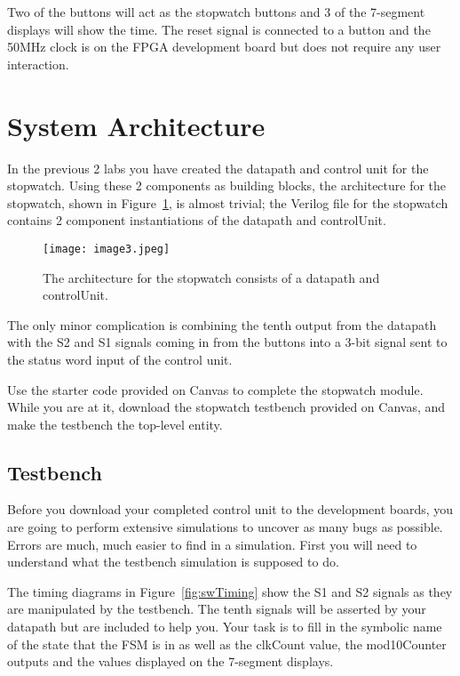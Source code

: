 Two of the buttons will act as the stopwatch buttons
and 3 of the 7-segment displays will show the time. The reset signal is
connected to a button and the 50MHz clock is on the FPGA
development board but does not require any user
interaction.

\section{System Architecture}

In the previous 2 labs you have created the datapath and control unit
for the stopwatch. Using these 2 components as building blocks, the
architecture for the stopwatch, shown in Figure~\ref{fig:swArch}, is almost trivial;
the Verilog file for the stopwatch contains 2 component instantiations
of the datapath and controlUnit.

\begin{figure}
\texttt{[image: image3.jpeg]}
\caption{The architecture for the stopwatch consists of a datapath and
controlUnit.}
\label{fig:swArch}
\end{figure}

The only minor complication is combining the tenth output from the
datapath with the S2 and S1 signals coming in from the
buttons into a 3-bit signal sent to the status word input of the control
unit.

Use the starter code provided on Canvas to complete the stopwatch
module. While you are at it, download the stopwatch testbench provided
on Canvas, and make the testbench the top-level entity.

\subsection{Testbench}

Before you download your completed control unit to the development boards,
you are going to perform extensive simulations to uncover as many bugs
as possible. Errors are much, much easier to find in a simulation. First
you will need to understand what the testbench simulation is supposed to
do.

The timing diagrams in Figure~\ref{fig:swTiming} show the S1 and S2 signals
as they are manipulated by the testbench. The tenth signals will be
asserted by your datapath but are included to help you. Your task is to
fill in the symbolic name of the state that the FSM is in as well as the
clkCount value, the mod10Counter outputs and the values displayed on the
7-segment displays.

